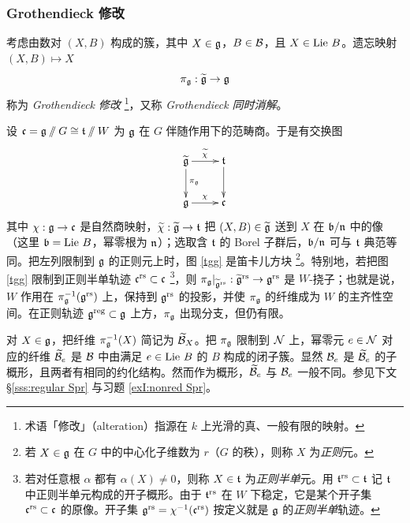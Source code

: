 \subsubsection{Grothendieck 修改}\label{sss:Gr alt}
考虑由数对 $(X,B)$ 构成的簇，其中 $X\in\mathfrak{g}$，$B\in\mathcal{B}$，且 $X\in\textup{Lie}\  B$。遗忘映射 $(X,B)\mapsto X$
\begin{equation*}
\pi_{\mathfrak{g}}: \widetilde{\mathfrak{g}}\to \mathfrak{g}
\end{equation*}
称为 {\em Grothendieck 修改} \footnote{术语「修改」（alteration）指源在 $k$ 上光滑的真、一般有限的映射。}，又称 {\em Grothendieck 同时消解}。

设 $\mathfrak{c}=\mathfrak{g}\sslash G\cong \mathfrak{t}\sslash W$ 为 $\mathfrak{g}$ 在 $G$ 伴随作用下的范畴商。于是有交换图
\begin{equation}\label{tgg}
\xymatrix{\tg\ar[d]^{\pi_{\frg}}\ar[r]^{\wt\chi} & \frt\ar[d]\\
\frg \ar[r]^{\chi} & \frc}
\end{equation}
其中 $\chi:\mathfrak{g}\to \mathfrak{c}$ 是自然商映射，$\widetilde\chi:\widetilde{\mathfrak{g}}\to \mathfrak{t}$ 把 $(X,B)\in\widetilde{\mathfrak{g}}$ 送到 $X$ 在 $\mathfrak{b}/\mathfrak{n}$ 中的像（这里 $\mathfrak{b}=\textup{Lie}\  B$，幂零根为 $\mathfrak{n}$）；选取含 $\mathfrak{t}$ 的 Borel 子群后，$\mathfrak{b}/\mathfrak{n}$ 可与 $\mathfrak{t}$ 典范等同。把左列限制到 $\mathfrak{g}$ 的正则元上时，图 \eqref{tgg} 是笛卡儿方块 \footnote{若 $X\in\mathfrak{g}$ 在 $G$ 中的中心化子维数为 $r$（$G$ 的秩），则称 $X$ 为{\em 正则}元。}。特别地，若把图 \eqref{tgg} 限制到正则半单轨迹 $\mathfrak{c}^{\textup{rs}}\subset \mathfrak{c}$ \footnote{若对任意根 $\alpha$ 都有 $\alpha(X)\neq0$，则称 $X\in\mathfrak{t}$ 为{\em 正则半单}元。用 $\mathfrak{t}^{\textup{rs}}\subset\mathfrak{t}$ 记 $\mathfrak{t}$ 中正则半单元构成的开子概形。由于 $\mathfrak{t}^{\textup{rs}}$ 在 $W$ 下稳定，它是某个开子集 $\mathfrak{c}^{\textup{rs}}\subset\mathfrak{c}$ 的原像。开子集 $\mathfrak{g}^{\textup{rs}}=\chi^{-1}(\mathfrak{c}^{\textup{rs}})$ 按定义就是 $\mathfrak{g}$ 的{\em 正则半单}轨迹。}，则 $\pi_{\mathfrak{g}}|_{\widetilde{\mathfrak{g}}^{\textup{rs}}}:\widetilde{\mathfrak{g}}^{\textup{rs}}\to \mathfrak{g}^{\textup{rs}}$ 是 $W$-挠子；也就是说，$W$ 作用在 $\pi_{\mathfrak{g}}^{-1}(\mathfrak{g}^{\textup{rs}})$ 上，保持到 $\mathfrak{g}^{\textup{rs}}$ 的投影，并使 $\pi_{\mathfrak{g}}$ 的纤维成为 $W$ 的主齐性空间。在正则轨迹 $\mathfrak{g}^{\textup{reg}}\subset \mathfrak{g}$ 上方，$\pi_{\mathfrak{g}}$ 出现分支，但仍有限。

对 $X\in \mathfrak{g}$，把纤维 $\pi_{\mathfrak{g}}^{-1}(X)$ 简记为 $\widetilde{\mathcal{B}}_{X}$。把 $\pi_{\mathfrak{g}}$ 限制到 $\mathcal{N}$ 上，幂零元 $e\in\mathcal{N}$ 对应的纤维 $\widetilde{\mathcal{B}}_{e}$ 是 $\mathcal{B}$ 中由满足 $e\in\textup{Lie}\  B$ 的 $B$ 构成的闭子簇。显然 $\mathcal{B}_{e}$ 是 $\widetilde{\mathcal{B}}_{e}$ 的子概形，且两者有相同的约化结构。然而作为概形，$\widetilde{\mathcal{B}}_{e}$ 与 $\mathcal{B}_{e}$ 一般不同。参见下文 \S\ref{sss:regular Spr} 与习题 \ref{exI:nonred Spr}。
